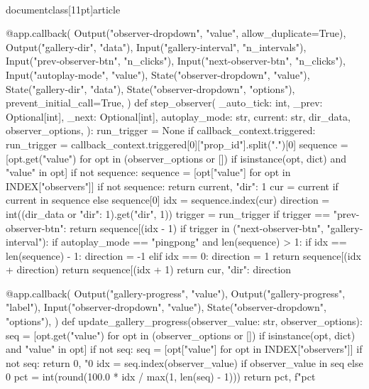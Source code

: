 \\documentclass[11pt]{article}
\begin{document}
\begin{CodeBlock}
{{{{{{{{@app.callback(
    Output("observer-dropdown", "value", allow_duplicate=True),
    Output("gallery-dir", "data"),
    Input("gallery-interval", "n_intervals"),
    Input("prev-observer-btn", "n_clicks"),
    Input("next-observer-btn", "n_clicks"),
    Input("autoplay-mode", "value"),
    State("observer-dropdown", "value"),
    State("gallery-dir", "data"),
    State("observer-dropdown", "options"),
    prevent_initial_call=True,
)
def step_observer(
    _auto_tick: int,
    _prev: Optional[int],
    _next: Optional[int],
    autoplay_mode: str,
    current: str,
    dir_data,
    observer_options,
):
    run_trigger = None
    if callback_context.triggered:
        run_trigger = callback_context.triggered[0]["prop_id"].split(".")[0]
    sequence = [opt.get("value") for opt in (observer_options or []) if isinstance(opt, dict) and "value" in opt]
    if not sequence:
        sequence = [opt["value"] for opt in INDEX["observers"]]
    if not sequence:
        return current, {"dir": 1}
    cur = current if current in sequence else sequence[0]
    idx = sequence.index(cur)
    direction = int((dir_data or {"dir": 1}).get("dir", 1))
    trigger = run_trigger
    if trigger == "prev-observer-btn":
        return sequence[(idx - 1) %
    if trigger in ("next-observer-btn", "gallery-interval"):
        if autoplay_mode == "pingpong" and len(sequence) > 1:
            if idx == len(sequence) - 1:
                direction = -1
            elif idx == 0:
                direction = 1
            return sequence[(idx + direction) %
        return sequence[(idx + 1) %
    return cur, {"dir": direction}


@app.callback(
    Output("gallery-progress", "value"),
    Output("gallery-progress", "label"),
    Input("observer-dropdown", "value"),
    State("observer-dropdown", "options"),
)
def update_gallery_progress(observer_value: str, observer_options):
    seq = [opt.get("value") for opt in (observer_options or []) if isinstance(opt, dict) and "value" in opt]
    if not seq:
        seq = [opt["value"] for opt in INDEX["observers"]]
    if not seq:
        return 0, "0%
    idx = seq.index(observer_value) if observer_value in seq else 0
    pct = int(round(100.0 * idx / max(1, len(seq) - 1)))
    return pct, f"{pct}%


}}}}}}}}
\end{CodeBlock}
\end{document}
